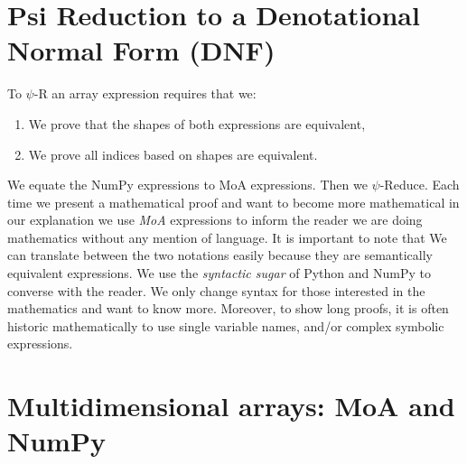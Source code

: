 \documentclass[a4paper,12pt]{article}
\begin{document}
\section{Psi Reduction to a Denotational Normal Form (DNF)}
To $\psi$-R an array expression requires that we:
\begin{enumerate}
    \item We  prove that the shapes of both expressions are equivalent,
    \item We prove all indices based on shapes are equivalent.
\end{enumerate}


We equate the NumPy expressions to MoA expressions. Then we $\psi$-Reduce.
Each time we present a mathematical proof and want to become more mathematical in our explanation we use  {\em MoA} expressions to inform the reader we are doing mathematics without any mention of language. It is important to note that We can translate between the two notations easily  because they are semantically equivalent expressions. We use the {\em syntactic sugar} of Python and NumPy to  converse with the reader. We only change syntax for those interested in the mathematics and want to know more. Moreover, to show long proofs, it is often historic mathematically to use single variable names, and/or complex symbolic expressions. 
\newpage
\section{Multidimensional arrays: MoA and NumPy}

\begin{comment}
\newcommand{\MoADefinition}[1]{
  \begin{itemize}
  #1
  \end{itemize}
}
\newcommand{\MoAItem}[3]{\item {#1}
  \begin{description}
  \item[MoA:] {#2}
  \item[NumPy:] {#3}
  \end{description}
}  
\end{comment}
\newcommand{\MoADefinition}[1]{
\renewcommand{\arraystretch}{2}
\begin{longtable}{| p{.5\textwidth} | p{.5\textwidth} |}
#1
\end{longtable}
\renewcommand{\arraystretch}{1}
}
\newcommand{\MoAItem}[3]{
\multicolumn2{l}{
  \begin{minipage}[l]{0.9\linewidth} \vspace{2ex}
  $\bullet$ #1\\[0.1ex]
  \end{minipage}
}\\\hline
\begin{minipage}[l]{0.95\linewidth}
{#2}  
\end{minipage}
&
\begin{minipage}[l]{0.95\linewidth}
{#3}  
\end{minipage}\\\hline
}
\end{document}
